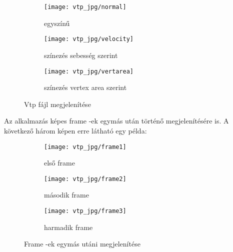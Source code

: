 \begin{figure}[!htb]
    \centering
    \begin{subfigure}[!htb]{0.32\textwidth}
        \centering
        \texttt{[image: vtp\_jpg/normal]}
        \caption{egyszínű}
    \end{subfigure}
    \hfill
    \begin{subfigure}[!htb]{0.32\textwidth}
        \centering
        \texttt{[image: vtp\_jpg/velocity]}
        \caption{színezés sebesség szerint}
    \end{subfigure}
    \hfill
    \begin{subfigure}[!htb]{0.32\textwidth}
        \centering
        \texttt{[image: vtp\_jpg/vertarea]}
        \caption{színezés vertex area szerint}
    \end{subfigure}
    \caption{Vtp fájl megjelenítése}
    \label{fig:x vtpcoloring}
\end{figure}

\clearpage
\noindent Az alkalmazás képes frame -ek egymás után történő megjelenítésére is. 
A következő három képen erre látható egy példa:

\begin{figure}[!htb]
    \centering
    \begin{subfigure}[!htb]{0.32\textwidth}
        \centering
        \texttt{[image: vtp\_jpg/frame1]}
        \caption{első frame}
    \end{subfigure}
    \hfill
    \begin{subfigure}[!htb]{0.32\textwidth}
        \centering
        \texttt{[image: vtp\_jpg/frame2]}
        \caption{második frame}
    \end{subfigure}
    \hfill
    \begin{subfigure}[!htb]{0.32\textwidth}
        \centering
        \texttt{[image: vtp\_jpg/frame3]}
        \caption{harmadik frame}
    \end{subfigure}
    \caption{Frame -ek egymás utáni megjelenítése}
    \label{fig:x frames}
\end{figure}

